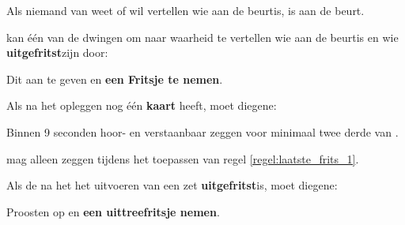 \vervolgLijst{}
\item Als niemand van \alleSpelers weet of wil vertellen wie aan de beurt\footnotemark[1] is, is \Frits aan de beurt\footnotemark[1].
\eindLijst{}

\vervolgLijst{}
\item \EenSpeler kan \'e\'en van de \medeSpelers dwingen om naar waarheid te vertellen wie aan de beurt\footnotemark[4] is en wie \textbf{uitgefritst}\footnotemark[4] zijn door:
\puntLijst{}
\item Dit aan te geven en \textbf{een Fritsje te nemen}\footnotemark[3].
\eindPuntLijst{}
\eindLijst{}

\footnotetext[3]{\footnoteFritsjeDesNemen}

\newpage
{}
\label{hoofdstuk:beurten_en_zetten_einde}


\vervolgLijst{}
\item Als \eenSpeler na het opleggen nog \'e\'en \textbf{kaart} heeft, moet diegene:
\puntLijst{}
\item Binnen 9 seconden hoor- en verstaanbaar  zeggen voor minimaal twee derde van \alleSpelersN.
\eindPuntLijst{}
\label{regel:laatste_frits_1}
\eindLijst{}

\vervolgLijst{}
\item \EenSpeler mag alleen  zeggen tijdens het toepassen van regel \ref{regel:laatste_frits_1}.
\eindLijst{}


\vervolgLijst{}
\item Als de \huidigeSpeler na het het uitvoeren van een zet \textbf{uitgefritst}\footnotemark[1] is, moet diegene:
\puntLijst{}
\item Proosten op  en \textbf{een uittreefritsje nemen}\footnotemark[2].
\eindPuntLijst{}
\label{regel:laatste_frits_2}
\eindLijst{}

